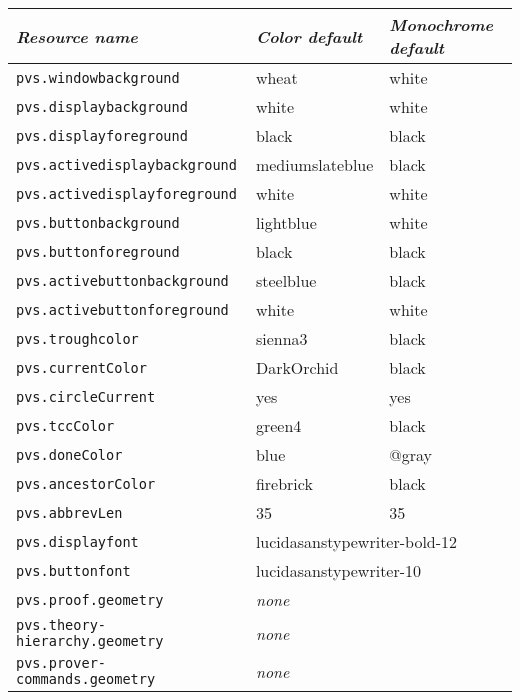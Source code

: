 \begin{center}
\begin{tabular}{|lll|}\hline
  {\it Resource name} & {\it Color default} & {\it Monochrome default}%
     \\ \hline
  \texttt{pvs.windowbackground} & wheat & white \\
  \texttt{pvs.displaybackground} & white & white \\
  \texttt{pvs.displayforeground} & black & black \\
  \texttt{pvs.activedisplaybackground} & mediumslateblue & black \\
  \texttt{pvs.activedisplayforeground} & white & white \\
  \texttt{pvs.buttonbackground} & lightblue & white \\
  \texttt{pvs.buttonforeground} & black & black \\
  \texttt{pvs.activebuttonbackground} & steelblue & black \\
  \texttt{pvs.activebuttonforeground} & white & white \\
  \texttt{pvs.troughcolor} & sienna3 & black \\
  \texttt{pvs.currentColor} & DarkOrchid & black \\
  \texttt{pvs.circleCurrent} & yes & yes \\
  \texttt{pvs.tccColor} & green4 & black \\
  \texttt{pvs.doneColor} & blue & @gray \\
  \texttt{pvs.ancestorColor} & firebrick & black \\
  \texttt{pvs.abbrevLen} & 35 & 35 \\
  \texttt{pvs.displayfont} & \multicolumn{2}{l|}{lucidasanstypewriter-bold-12} \\
  \texttt{pvs.buttonfont} & \multicolumn{2}{l|}{lucidasanstypewriter-10} \\
  \texttt{pvs.proof.geometry} & \multicolumn{2}{l|}{\hspace*{.5in}\emph{none}} \\
  \texttt{pvs.theory-hierarchy.geometry} & \multicolumn{2}{l|}{\hspace*{.5in}\emph{none}} \\
  \texttt{pvs.prover-commands.geometry} & \multicolumn{2}{l|}{\hspace*{.5in}\emph{none}} \\
  \hline
\end{tabular}
\end{center}

